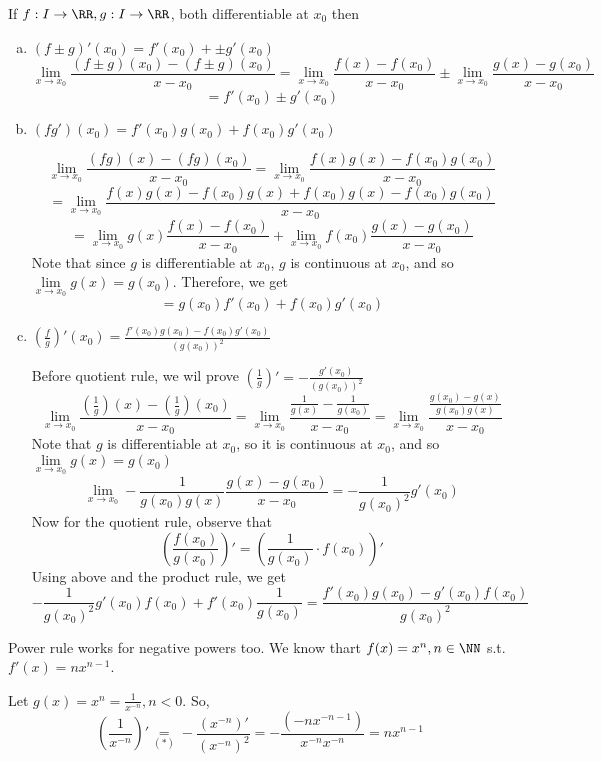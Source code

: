 \documentclass[12pt]{scrartcl}
\begin{document}
\begin{theorem}
  If $f: I \to \RR, g: I \to \RR$, both differentiable at $x_0$ then 
  \begin{enumerate}[a.]
    \item $(f \pm g)'(x_0) = f'(x_0) +\pm g'(x_0)$
  \[\lim_{x\to x_0}\frac{(f\pm g)(x_0) - (f\pm g)(x_0)}{x - x_0} = \lim_{x\to x_0} \frac{f(x) - f(x_0)}{x - x_0} \pm \lim_{x\to x_0}\frac{g(x) - g(x_0)}{x - x_0}\]
  \[= f'(x_0) \pm g'(x_0)\]

    \item $(fg')(x_0) = f'(x_0)g(x_0) + f(x_0)g'(x_0)$
    
  \[\lim_{x\to x_0}\frac{(fg)(x) - (fg)(x_0)}{x - x_0} = \lim_{x\to x_0}\frac{f(x)g(x) - f(x_0)g(x_0)}{x - x_0}\]
  \[= \lim_{x\to x_0}\frac{f(x)g(x) - f(x_0)g(x) + f(x_0)g(x) - f(x_0)g(x_0)}{x - x_0}\]
  \[= \lim_{x\to x_0}g(x)\frac{f(x) - f(x_0)}{x - x_0} + \lim_{x\to x_0} f(x_0)\frac{g(x) - g(x_0)}{x-x_0}\]
  Note that since $g$ is differentiable at $x_0$, $g$ is continuous at $x_0$, and 
  so $\underset{x\to x_0}{\lim}g(x) = g(x_0)$. Therefore, we get 
  \[= g(x_0)f'(x_0) + f(x_0)g'(x_0)\]

    \item $(\frac{f}{g})'(x_0) = \frac{f'(x_0)g(x_0) - f(x_0)g'(x_0)}{(g(x_0))^2}$
  
  Before quotient rule, we wil prove $(\frac{1}{g})' = -\frac{g'(x_0)}{(g(x_0))^2}$
    \[\lim_{x\to x_0} \dfrac{(\frac{1}{g})(x) - (\frac{1}{g})(x_0)}{x-x_0} = \lim_{x\to x_0 }\dfrac{\frac{1}{g(x)} -  \frac{1}{g(x_0)}}{x-x_0} = \lim_{x\to x_0}\frac{\frac{g(x_0) - g(x)}{g(x_0)g(x)}}{x-x_0}\]
    Note that $g$ is differentiable at $x_0$, so it is continuous at $x_0$, and so 
    $\underset{x\to x_0}{\lim}g(x) = g(x_0)$
    \[\lim_{x\to x_0}-\frac{1}{g(x_0)g(x)}\frac{g(x) - g(x_0)}{x - x_0} = -\frac{1}{g(x_0)^2}g'(x_0)\]
  Now for the quotient rule, observe that 
  \[(\frac{f(x_0)}{g(x_0)})' = (\frac{1}{g(x_0)} \cdot f(x_0))'\]
  Using above and the product rule, we get 
  \[-\frac{1}{g(x_0)^2}g'(x_0) f(x_0) + f'(x_0)\frac{1}{g(x_0)} = \frac{f'(x_0)g(x_0) - g'(x_0)f(x_0)}{g(x_0)^2}\]
  \end{enumerate}
\end{theorem}

\begin{note}
  Power rule works for negative powers too. We know thart $f(x) = x^n, n \in \NN$ s.t. $f'(x) = nx^{n-1}$.

  Let $g(x) = x^n = \frac{1}{x^{-n}}, n < 0$. So, 
  \[(\frac{1}{x^{-n}})' \underset{(*)}{=} -\frac{(x^{-n})'}{(x^{-n})^2} = -\frac{(-nx^{-n-1})}{x^{-n}x^{-n}} = nx^{n-1}\]
\end{note}
\end{document}
